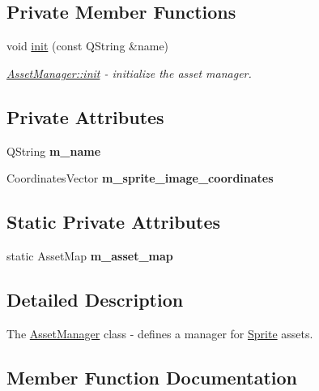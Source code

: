 \subsection*{Private Member Functions}
\begin{DoxyCompactItemize}
\item 
void \hyperlink{class_asset_manager_aa1d50ebdf4aa6df6fba090e649eb6ec0}{init} (const Q\+String \&name)
\begin{DoxyCompactList}\small\item\em \hyperlink{class_asset_manager_aa1d50ebdf4aa6df6fba090e649eb6ec0}{Asset\+Manager\+::init} -\/ initialize the asset manager. \end{DoxyCompactList}\end{DoxyCompactItemize}
\subsection*{Private Attributes}
\begin{DoxyCompactItemize}
\item 
\mbox{\label{class_asset_manager_a64d1471c74b7bcd96ebc04e4a3458d54}} 
Q\+String {\bfseries m\+\_\+name}
\item 
\mbox{\label{class_asset_manager_af8c2ecb2870be050880deed6d55f5332}} 
Coordinates\+Vector {\bfseries m\+\_\+sprite\+\_\+image\+\_\+coordinates}
\end{DoxyCompactItemize}
\subsection*{Static Private Attributes}
\begin{DoxyCompactItemize}
\item 
\mbox{\label{class_asset_manager_a8c7dee0564fcd582ae15c299afa758f2}} 
static Asset\+Map {\bfseries m\+\_\+asset\+\_\+map}
\end{DoxyCompactItemize}


\subsection{Detailed Description}
The \hyperlink{class_asset_manager}{Asset\+Manager} class -\/ defines a manager for \hyperlink{class_sprite}{Sprite} assets. 

\subsection{Member Function Documentation}
\mbox{\label{class_asset_manager_aa1d50ebdf4aa6df6fba090e649eb6ec0}} 
